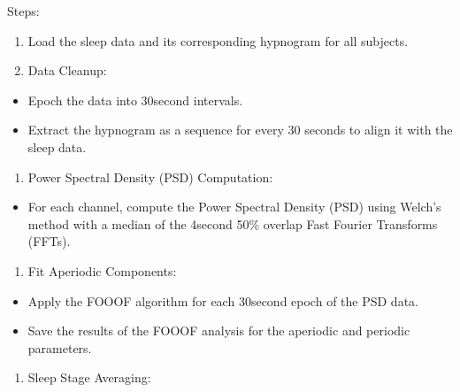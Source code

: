 \documentclass[letterpaper,10pt,english]{sphinxmanual}
\begin{document}
\sphinxAtStartPar
Steps:
\begin{enumerate}
%
\item {} 
\sphinxAtStartPar
Load the sleep data and its corresponding hypnogram for all subjects.

\item {} 
\sphinxAtStartPar
Data Cleanup:

\end{enumerate}
\begin{itemize}
\item {} 
\sphinxAtStartPar
Epoch the data into 30\sphinxhyphen{}second intervals.

\item {} 
\sphinxAtStartPar
Extract the hypnogram as a sequence for every 30 seconds to align it with the sleep data.

\end{itemize}
\begin{enumerate}
%
\setcounter{enumi}{2}
\item {} 
\sphinxAtStartPar
Power Spectral Density (PSD) Computation:

\end{enumerate}
\begin{itemize}
\item {} 
\sphinxAtStartPar
For each channel, compute the Power Spectral Density (PSD) using Welch’s method with a median of the 4\sphinxhyphen{}second 50\% overlap Fast Fourier Transforms (FFTs).

\end{itemize}
\begin{enumerate}
%
\setcounter{enumi}{3}
\item {} 
\sphinxAtStartPar
Fit Aperiodic Components:

\end{enumerate}
\begin{itemize}
\item {} 
\sphinxAtStartPar
Apply the FOOOF algorithm for each 30\sphinxhyphen{}second epoch of the PSD data.

\item {} 
\sphinxAtStartPar
Save the results of the FOOOF analysis for the aperiodic and periodic parameters.

\end{itemize}
\begin{enumerate}
%
\setcounter{enumi}{4}
\item {} 
\sphinxAtStartPar
Sleep Stage Averaging:

\end{enumerate}
\end{document}
